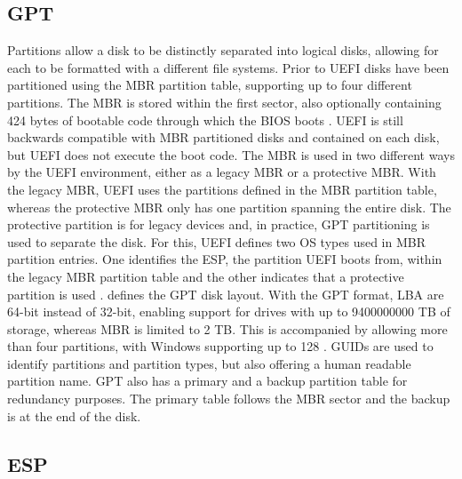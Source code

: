 \subsection{\acf{GPT}}

Partitions allow a disk to be distinctly separated into logical disks, allowing for each to be formatted with a different file systems.
Prior to \ac{UEFI} disks have been partitioned using the \ac{MBR} partition table, supporting up to four different partitions.
The \ac{MBR} is stored within the first sector, also optionally containing 424 bytes of bootable code through which the \ac{BIOS} boots \cite[Section 13.3.1]{uefi-spec}.
\ac{UEFI} is still backwards compatible with \ac{MBR} partitioned disks and contained on each disk, but \ac{UEFI} does not execute the boot code.
The \ac{MBR} is used in two different ways by the \ac{UEFI} environment, either as a legacy \ac{MBR} or a protective \ac{MBR}.
With the legacy \ac{MBR}, \ac{UEFI} uses the partitions defined in the \ac{MBR} partition table, whereas the protective \ac{MBR} only has one partition spanning the entire disk.
The protective partition is for legacy devices and, in practice, \ac{GPT} partitioning is used to separate the disk.
For this, \ac{UEFI} defines two \ac{OS} types used in \ac{MBR} partition entries.
One identifies the \ac{ESP}, the partition \ac{UEFI} boots from, within the legacy \ac{MBR} partition table and the other indicates that a protective partition is used \cite[Section 5]{uefi-spec}.
\cite[Section 5]{uefi-spec} defines the \ac{GPT} disk layout. With the \ac{GPT} format, \ac{LBA} are 64-bit instead of 32-bit, enabling support for drives with up to 9400000000 \ac{TB} of storage, whereas \ac{MBR} is limited to 2 \ac{TB}.
This is accompanied by allowing more than four partitions, with Windows supporting up to 128 \cite{microsoft-windows-and-gpt-faq}.
\acp{GUID} are used to identify partitions and partition types, but also offering a human readable partition name.
\ac{GPT} also has a primary and a backup partition table for redundancy purposes.
The primary table follows the \ac{MBR} sector and the backup is at the end of the disk.

\subsection{\acf{ESP}}

